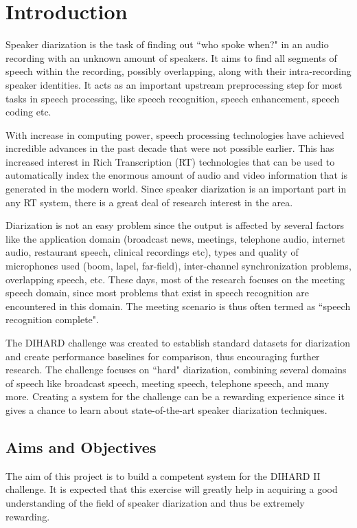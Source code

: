 \chapter{Introduction}

Speaker diarization is the task of finding out ``who spoke when?" in an audio recording with an unknown amount of speakers. It aims to find all segments of speech within the recording, possibly overlapping, along with their intra-recording speaker identities. It acts as an important upstream preprocessing step for most tasks in speech processing, like speech recognition, speech enhancement, speech coding etc.

With increase in computing power, speech processing technologies have achieved incredible advances in the past decade that were not possible earlier. This has increased interest in Rich Transcription (RT) technologies that can be used to automatically index the enormous amount of audio and video information that is generated in the modern world. Since speaker diarization is an important part in any RT system, there is a great deal of research interest in the area.

Diarization is not an easy problem since the output is affected by several factors like the application domain (broadcast news, meetings, telephone audio, internet audio, restaurant speech, clinical recordings etc), types and quality of microphones used (boom, lapel, far-field), inter-channel synchronization problems, overlapping speech, etc. These days, most of the research focuses on the meeting speech domain, since most problems that exist in speech recognition are encountered in this domain. The meeting scenario is thus often termed as ``speech recognition complete".

The DIHARD challenge was created to establish standard datasets for diarization and create performance baselines for comparison, thus encouraging further research. The challenge focuses on ``hard" diarization, combining several domains of speech like broadcast speech, meeting speech, telephone speech, and many more. Creating a system for the challenge can be a rewarding experience since it gives a chance to learn about state-of-the-art speaker diarization techniques.

\section{Aims and Objectives}

The aim of this project is to build a competent system for the DIHARD II challenge. It is expected that this exercise will greatly help in acquiring a good understanding of the field of speaker diarization and thus be extremely rewarding.

